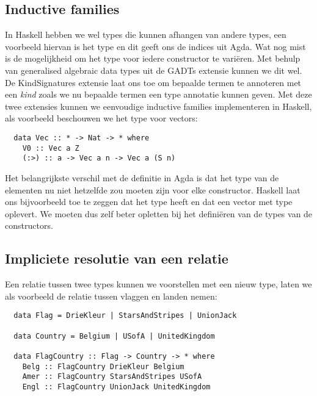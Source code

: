 \subsection{Inductive families}

In Haskell hebben we wel types die kunnen afhangen van andere types, een
voorbeeld hiervan is het  type en dit geeft ons de indices uit
Agda. Wat nog mist is de mogelijkheid om het type voor iedere constructor te
variëren. Met behulp van generalised algebraic data types \cite{gadts} uit de
GADTs extensie kunnen we dit wel. De KindSignatures extensie laat ons toe om
bepaalde termen te annoteren met een \emph{kind} zoals we nu bepaalde termen
een type annotatie kunnen geven. Met deze twee extensies kunnen we eenvoudige
inductive families implementeren in Haskell, als voorbeeld beschouwen we het
type voor vectors:

\begin{verbatim}
  data Vec :: * -> Nat -> * where
    V0 :: Vec a Z
    (:>) :: a -> Vec a n -> Vec a (S n)
\end{verbatim}

Het belangrijkste verschil met de definitie in Agda is dat het type van de
elementen nu niet hetzelfde zou moeten zijn voor elke constructor. Haskell laat
ons bijvoorbeeld toe te zeggen dat  het type  heeft
en dat \ihask{(:>)} een vector met type  oplevert. We
moeten dus zelf beter opletten bij het definiëren van de types van de
constructors.

\subsection{Impliciete resolutie van een relatie}

Een relatie tussen twee types kunnen we voorstellen met een nieuw type, laten
we als voorbeeld de relatie tussen vlaggen en landen nemen:

\begin{verbatim}
  data Flag = DrieKleur | StarsAndStripes | UnionJack

  data Country = Belgium | USofA | UnitedKingdom

  data FlagCountry :: Flag -> Country -> * where
    Belg :: FlagCountry DrieKleur Belgium
    Amer :: FlagCountry StarsAndStripes USofA
    Engl :: FlagCountry UnionJack UnitedKingdom
\end{verbatim}

